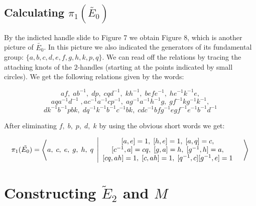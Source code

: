 \documentclass[11pt]{amsart}
\begin{document}
\subsection{ Calculating $ \pi_{1}(\tilde{E_{0}}) $}

By the indicted handle slide to Figure 7 we obtain Figure 8, which is another picture of $ \tilde{E_{0}}$. In this picture  we also indicated the generators of its fundamental group: $\{a,b, c,d,e,f,g,h,k,p,q\}$. We can read off the relations by tracing the attaching knots of the $2$-handles  (starting at the points indicated by small circles). We get the following relations given by the words:
 
 \vspace{.05in}
 
   $$af, \;ab^{-1}, \; dp, \; cqd^{-1}, \; kh^{-1}, \; befe^{-1}, \; he^{-1}k^{-1}e,$$   
   $$aqa^{-1}d^{-1}\;, ac^{-1}a^{-1}cp^{-1}, \; ag^{-1}a^{-1}h^{-1}g, \; gf^{-1}kg^{-1}k^{-1}, $$$$dk^{-1}b^{-1}pbk, \; dq^{-1}k^{-1}b^{-1}c^{-1}bk, \; cdc^{-1}bfg^{-1}egf^{-1}e^{-1}b^{-1}d^{-1}$$

 
  \vspace{.05in}
 
 After eliminating $f,\;b,\;p,\;d,\;k $ by using the obvious short words we get: 
 
  \begin{equation*}
 \pi_{1}(\tilde{E_0}) = \left\langle a,\; c,\; e,\; g,\; h,\; q \; \left| 
\begin{array}{cc}
[a,e]=1,  \;  [h,e]=1,  \;  [a,q]=c, & \\
 $$[c^{-1},a]=cq, \; [g,a]=h, \; [g^{-1},h]=a,
  & \\
$$[cq,ah]=1,\; [c,ah]=1,\;  [q^{-1},c][g^{-1},e]=1&
\end{array}  \right\rangle \right.
\end{equation*}

\vspace{.1in}

\section{Constructing $\tilde{E}_{2}$ and $M$}
\end{document}
